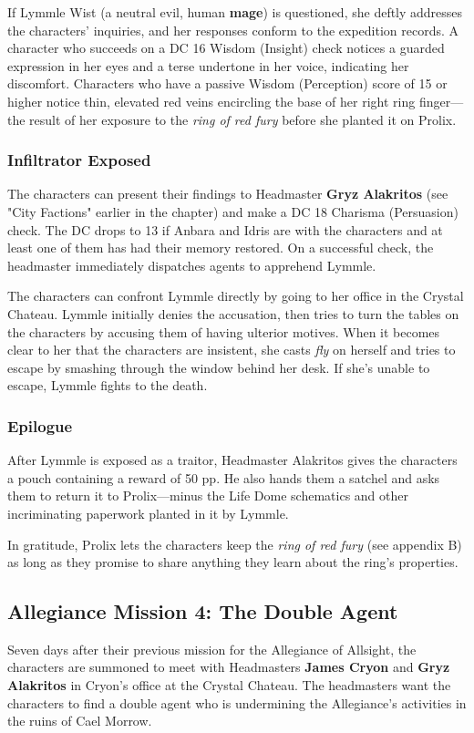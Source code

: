 \documentclass[10pt,a4paper,twoside,bg=print,twocolumn,openany,nodeprecatedcode]{dndbook}
\begin{document}
If Lymmle Wist (a neutral evil, human \textbf{mage}) is questioned, she deftly addresses the characters' inquiries, and her responses conform to the expedition records. A character who succeeds on a DC 16 Wisdom (Insight) check notices a guarded expression in her eyes and a terse undertone in her voice, indicating her discomfort. Characters who have a passive Wisdom (Perception) score of 15 or higher notice thin, elevated red veins encircling the base of her right ring finger—the result of her exposure to the \textit{ring of red fury} before she planted it on Prolix.

\subsubsection{Infiltrator Exposed}
The characters can present their findings to Headmaster \textbf{Gryz Alakritos} (see "City Factions" earlier in the chapter) and make a DC 18 Charisma (Persuasion) check. The DC drops to 13 if Anbara and Idris are with the characters and at least one of them has had their memory restored. On a successful check, the headmaster immediately dispatches agents to apprehend Lymmle.

The characters can confront Lymmle directly by going to her office in the Crystal Chateau. Lymmle initially denies the accusation, then tries to turn the tables on the characters by accusing them of having ulterior motives. When it becomes clear to her that the characters are insistent, she casts \textit{fly} on herself and tries to escape by smashing through the window behind her desk. If she's unable to escape, Lymmle fights to the death.

\subsubsection{Epilogue}
After Lymmle is exposed as a traitor, Headmaster Alakritos gives the characters a pouch containing a reward of 50 pp. He also hands them a satchel and asks them to return it to Prolix—minus the Life Dome schematics and other incriminating paperwork planted in it by Lymmle.

In gratitude, Prolix lets the characters keep the \textit{ring of red fury} (see appendix B) as long as they promise to share anything they learn about the ring's properties.

\subsection{Allegiance Mission 4: The Double Agent}
Seven days after their previous mission for the Allegiance of Allsight, the characters are summoned to meet with Headmasters \textbf{James Cryon} and \textbf{Gryz Alakritos} in Cryon's office at the Crystal Chateau. The headmasters want the characters to find a double agent who is undermining the Allegiance's activities in the ruins of Cael Morrow.
\end{document}
